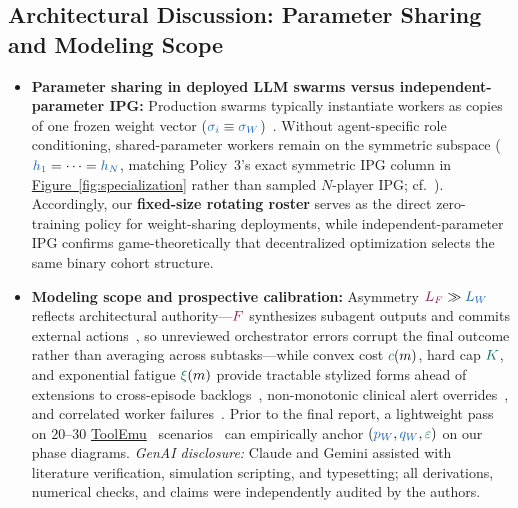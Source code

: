 \documentclass[11pt,reqno]{amsart}
\theoremstyle{spacious}
\newcommand{\Wtxt}[1]{\textcolor{colW}{#1}}
\newcommand{\Ftxt}[1]{\textcolor{colF}{#1}}
\newcommand{\Wv}[1]{{\color{colW}#1}}
\newcommand{\Fv}[1]{{\color{colF}#1}}
\newcommand{\Hv}[1]{{\color{colH}#1}}
\begin{document}
\subsection{Architectural Discussion: Parameter Sharing and Modeling Scope}
\label{subsec:discussion}

\begin{itemize}
  \setlength{\itemsep}{4pt}
  \item \textbf{Parameter sharing in deployed LLM swarms versus independent-parameter IPG:}
  Production swarms typically instantiate \Wtxt{workers} as copies of one frozen weight vector ($\Wv{\sigma_i} \equiv \Wv{\sigma_W}$)~\cite{anthropic2025research,kimi2026k25,paglieri2026swarm}. Without agent-specific role conditioning, shared-parameter \Wtxt{workers} remain on the symmetric subspace ($\Wv{h_1} = \dots = \Wv{h_N}$, matching Policy~3's exact symmetric IPG column in \hyperref[fig:specialization]{Figure~\ref{fig:specialization}} rather than sampled $N$-player IPG; cf.~\cite{casheekar2026report}). Accordingly, our \textbf{fixed-size rotating roster} serves as the direct zero-training policy for weight-sharing deployments, while independent-parameter IPG confirms game-theoretically that decentralized optimization selects the same binary cohort structure.

  \item \textbf{Modeling scope and prospective calibration:}
  Asymmetry $\Fv{L_F} \gg \Wv{L_W}$ reflects architectural authority---$\Fv{F}$ synthesizes subagent outputs and commits external actions~\cite{anthropic2025research,kimi2026k25}, so unreviewed \Ftxt{orchestrator} errors corrupt the final outcome rather than averaging across subtasks---while convex cost $\Hv{c}(m)$, hard cap $\Hv{K}$, and exponential fatigue $\Hv{\xi}(m)$ provide tractable stylized forms ahead of extensions to cross-episode backlogs~\cite{lykouris2024congested,saketos2026defer}, non-monotonic clinical alert overrides~\cite{ancker2017alertfatigue}, and correlated \Wtxt{worker} failures~\cite{anthropic2026multiagent}. Prior to the final report, a lightweight pass on $20$--$30$ \href{https://arxiv.org/abs/2309.15817}{ToolEmu}~\cite{ruan2024toolemu} scenarios~\cite{overman2026oversight} can empirically anchor $(\Wv{p_W}, \Wv{q_W}, \Hv{\varepsilon})$ on our phase diagrams. \emph{GenAI disclosure:} Claude and Gemini assisted with literature verification, simulation scripting, and typesetting; all derivations, numerical checks, and claims were independently audited by the authors.
\end{itemize}
\end{document}
